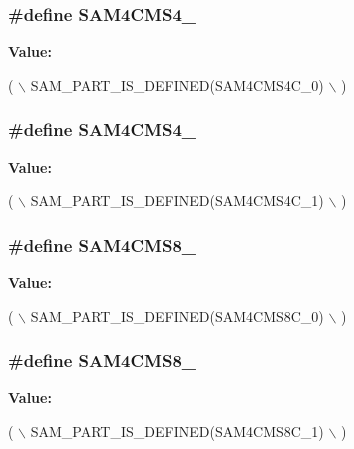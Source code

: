 \subsubsection[{S\+A\+M4\+C\+M\+S4\+\_\+0}]{\setlength{\rightskip}{0pt plus 5cm}\#define S\+A\+M4\+C\+M\+S4\+\_}\label{group__sam__part__macros__group_gac5948c5b98244c8de9c1eeab81f04f35}
{\bfseries Value\+:}
\begin{DoxyCode}
( \(\backslash\)
        SAM\_PART\_IS\_DEFINED(SAM4CMS4C\_0) \(\backslash\)
        )
\end{DoxyCode}
\hypertarget{group__sam__part__macros__group_ga1c89b42ee6abb2dd5a03e9522a0e9652}{}
\subsubsection[{S\+A\+M4\+C\+M\+S4\+\_\+1}]{\setlength{\rightskip}{0pt plus 5cm}\#define S\+A\+M4\+C\+M\+S4\+\_}\label{group__sam__part__macros__group_ga1c89b42ee6abb2dd5a03e9522a0e9652}
{\bfseries Value\+:}
\begin{DoxyCode}
( \(\backslash\)
        SAM\_PART\_IS\_DEFINED(SAM4CMS4C\_1) \(\backslash\)
        )
\end{DoxyCode}
\hypertarget{group__sam__part__macros__group_gabda280fc5acf03bfd252e320e6695e38}{}
\subsubsection[{S\+A\+M4\+C\+M\+S8\+\_\+0}]{\setlength{\rightskip}{0pt plus 5cm}\#define S\+A\+M4\+C\+M\+S8\+\_}\label{group__sam__part__macros__group_gabda280fc5acf03bfd252e320e6695e38}
{\bfseries Value\+:}
\begin{DoxyCode}
( \(\backslash\)
        SAM\_PART\_IS\_DEFINED(SAM4CMS8C\_0) \(\backslash\)
        )
\end{DoxyCode}
\hypertarget{group__sam__part__macros__group_gadceba71b218ba66c640a14073c6a5692}{}
\subsubsection[{S\+A\+M4\+C\+M\+S8\+\_\+1}]{\setlength{\rightskip}{0pt plus 5cm}\#define S\+A\+M4\+C\+M\+S8\+\_}\label{group__sam__part__macros__group_gadceba71b218ba66c640a14073c6a5692}
{\bfseries Value\+:}
\begin{DoxyCode}
( \(\backslash\)
        SAM\_PART\_IS\_DEFINED(SAM4CMS8C\_1) \(\backslash\)
        )
\end{DoxyCode}
\hypertarget{group__sam__part__macros__group_gaa7359e4b343a4ab48894b656b2f349b9}{}
